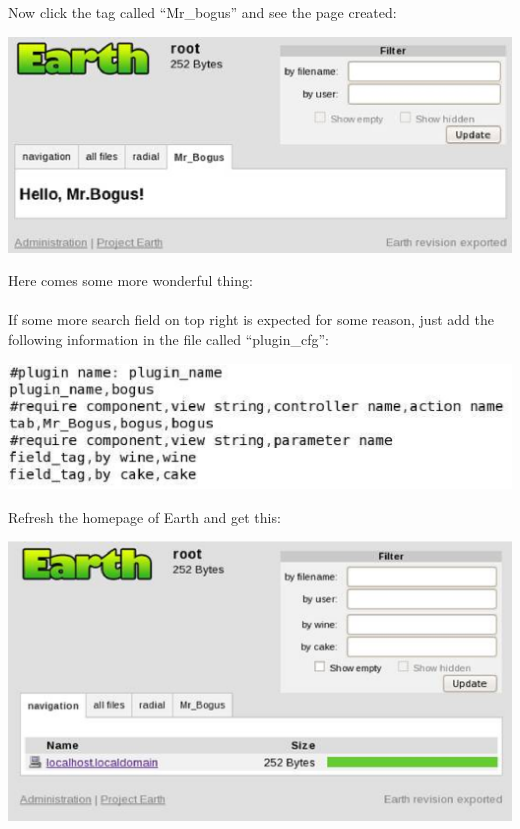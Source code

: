 \documentclass[10pt,oneside]{article}
\begin{document}
Now click the tag called “Mr\_bogus” and see the page created:\\
\begin{center}
 \includegraphics[width=150mm]{fig/instruction-7.eps}\\
\end{center}
Here comes some more wonderful thing:\\
\\
If some more search field on top right is expected for some reason, just add the following information in the file called “plugin\_cfg”:\\
\begin{center}
 \includegraphics[width=150mm]{fig/instruction-8.eps}\\
\end{center}
Refresh the homepage of Earth and get this:\\
\begin{center}
 \includegraphics[width=150mm]{fig/instruction-9.eps}\\
\end{center}
\end{document}
